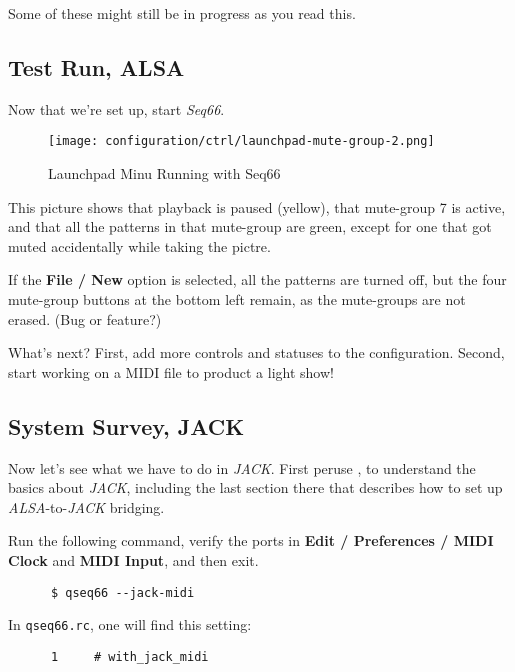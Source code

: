    Some of these might still be in progress as you read this.

\subsection{Test Run, ALSA}
\label{subsubsec:launchpad_mini_test_run_alsa}

   Now that we're set up, start \textsl{Seq66}.

\begin{figure}[H]
   \centering 
   \texttt{[image: configuration/ctrl/launchpad-mute-group-2.png]}
   \caption{Launchpad Minu Running with Seq66}
   \label{fig:launchpad_mute_group_perspective}
\end{figure}

   This picture shows that playback is paused (yellow), that mute-group 7 is
   active, and that all the patterns in that mute-group are green, except for one
   that got muted accidentally while taking the pictre.

   If the \textbf{File / New} option is selected, all the patterns are turned off,
   but the four mute-group buttons at the bottom left remain, as the mute-groups
   are not erased.  (Bug or feature?)

   What's next?  First, add more controls and statuses to the configuration.
   Second, start working on a MIDI file to product a light show!

\subsection{System Survey, JACK}
\label{subsec:launchpad_mini_survey_jack}

   Now let's see what we have to do in \textsl{JACK}.
   First peruse , to understand the basics about
   \textsl{JACK}, including the last section there that describes how to set up
   \textsl{ALSA}-to-\textsl{JACK} bridging.

   Run the following command, verify the ports in
   \textbf{Edit / Preferences / MIDI Clock} and \textbf{MIDI Input}, and then
   exit.

   \begin{verbatim}
      $ qseq66 --jack-midi
   \end{verbatim}

   In \texttt{qseq66.rc}, one will find this setting:

   \begin{verbatim}
      1     # with_jack_midi
   \end{verbatim}

